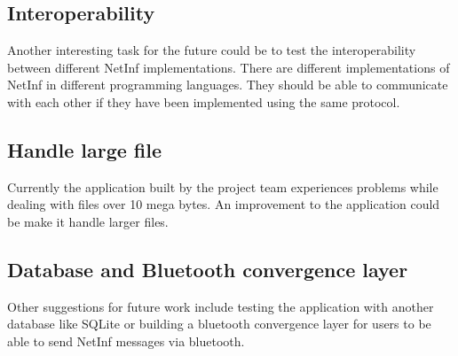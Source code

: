 \subsection{Interoperability}

Another interesting task for the future could be to test the interoperability between different NetInf implementations. There are different implementations of NetInf in different programming languages. They should be able to communicate with each other if they have been implemented using the same protocol. 

\subsection{Handle large file}

Currently the application built by the project team experiences problems while dealing with files over 10 mega bytes. An improvement to the application could be make it handle larger files.

\subsection{Database and Bluetooth convergence layer}

Other suggestions for future work include testing the application with another database like SQLite or building a bluetooth convergence layer for users to be able to send NetInf messages via bluetooth. 
